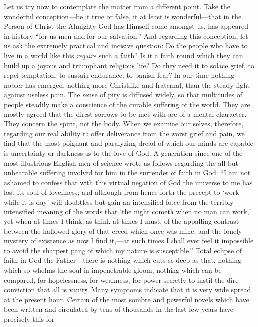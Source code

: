 \documentclass[12pt,a5paper,oneside]{book}
\begin{document}
Let us try now to contemplate the matter
from a different point. Take the wonderful
conception---be it true or false, it at least is
wonderful---that in the Person of Christ the
Almighty God has Himself come amongst us,
has appeared in history ``for us men and for
our salvation.'' And regarding this conception,
let us ask the extremely practical and incisive
question: Do the people who have to live in
a world like this \textit{require} such a faith? Is it
a faith round which they can build up a
joyous and triumphant religious life? Do they
need it to solace grief, to repel temptation, to
sustain endurance, to banish fear? In our
time nothing nobler has emerged, nothing more
Christlike and fraternal, than the steady fight
against useless pain. The sense of pity is
diffused widely, so that multitudes of people
steadily make a conscience of the curable
suffering of the world. They are mostly
agreed that the direst sorrows to be met with
are of a mental character. They concern the
spirit, not the body. When we examine our
selves, therefore, regarding our real ability to
offer deliverance from the worst grief and pain,
we find that the most poignant and paralyzing
dread of which our minds are capable is
uncertainty or darkness as to the love of God.
A generation since one of the most illustrious
English men of science wrote as follows regarding 
the all but unbearable suffering involved for
him in the surrender of faith in God: ``I am
not ashamed to confess that with this virtual
negation of God the universe to me has lost its
soul of loveliness; and although from hence
forth the precept to `work while it is day'
will doubtless but gain an intensified force from
the terribly intensified meaning of the words
that `the night cometh when no man can
work,' yet when at times I think, as think at
times I must, of the appalling contrast between
the hallowed glory of that creed which once
was mine, and the lonely mystery of existence
as now I find it,---at such times I shall ever
feel it impossible to avoid the sharpest pang
of which my nature is susceptible.'' Total
eclipse of faith in God the Father---there is
nothing which cuts so deep as that, nothing
which so whelms the soul in impenetrable
gloom, nothing which can be compared, for
hopelessness, for weakness, for power secretly
to instil the dire conviction that all is vanity.
Many symptoms indicate that it is very wide
spread at the present hour. Certain of the
most sombre and powerful novels which have
been written and circulated by tens of thousands
in the last few years have precisely this for
\end{document}
